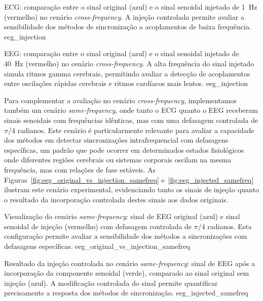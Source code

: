 {ECG: comparação entre o sinal original (azul) e o sinal senoidal injetado de 1~Hz (vermelho) no cenário \textit{cross-frequency}. A injeção controlada permite avaliar a sensibilidade dos métodos de sincronização a acoplamentos de baixa frequência.}
{ecg_injection}

{EEG: comparação entre o sinal original (azul) e o sinal senoidal injetado de 40~Hz (vermelho) no cenário \textit{cross-frequency}. A alta frequência do sinal injetado simula ritmos gamma cerebrais, permitindo avaliar a detecção de acoplamentos entre oscilações rápidas cerebrais e ritmos cardíacos mais lentos.}
{eeg_injection}

Para complementar a avaliação no cenário \textit{cross-frequency}, implementamos também um cenário \textit{same-frequency}, onde tanto o ECG quanto o EEG receberam sinais senoidais com frequências idênticas, mas com uma defasagem controlada de \(\pi/4\) radianos. Este cenário é particularmente relevante para avaliar a capacidade dos métodos em detectar sincronizações intrafrequencial com defasagens específicas, um padrão que pode ocorrer em determinados estados fisiológicos onde diferentes regiões cerebrais ou sistemas corporais oscilam na mesma frequência, mas com relações de fase estáveis. As Figuras~\ref{fig:eeg_original_vs_injection_samefreq} e~\ref{fig:eeg_injected_samefreq} ilustram este cenário experimental, evidenciando tanto os sinais de injeção quanto o resultado da incorporação controlada destes sinais aos dados originais.

{Visualização do cenário \textit{same-frequency}: sinal de EEG original (azul) e sinal senoidal de injeção (vermelho) com defasagem controlada de \(\pi/4\) radianos. Esta configuração permite avaliar a sensibilidade dos métodos a sincronizações com defasagens específicas.}
{eeg_original_vs_injection_samefreq}

{Resultado da injeção controlada no cenário \textit{same-frequency}: sinal de EEG após a incorporação da componente senoidal (verde), comparado ao sinal original sem injeção (azul). A modificação controlada do sinal permite quantificar precisamente a resposta dos métodos de sincronização.}
{eeg_injected_samefreq}

